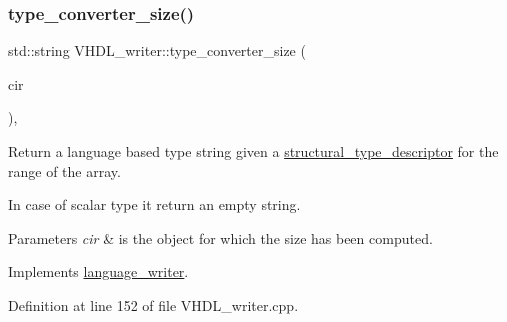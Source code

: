\subsubsection{\texorpdfstring{type\+\_\+converter\+\_\+size()}{type\_converter\_size()}}
{\footnotesize\ttfamily std\+::string V\+H\+D\+L\+\_\+writer\+::type\+\_\+converter\+\_\+size (\begin{DoxyParamCaption}\item[{const \hyperlink{structural__objects_8hpp_a8ea5f8cc50ab8f4c31e2751074ff60b2}{structural\+\_\+object\+Ref} \&}]{cir }\end{DoxyParamCaption})\hspace{0.3cm}{\ttfamily [override]}, {\ttfamily [virtual]}}



Return a language based type string given a \hyperlink{structstructural__type__descriptor}{structural\+\_\+type\+\_\+descriptor} for the range of the array. 

In case of scalar type it return an empty string. 
\begin{DoxyParams}{Parameters}
{\em cir} & is the object for which the size has been computed. \\
\hline
\end{DoxyParams}


Implements \hyperlink{classlanguage__writer_a154f45ed77a5dff96d190b4e1ccfa366}{language\+\_\+writer}.



Definition at line 152 of file V\+H\+D\+L\+\_\+writer.\+cpp.



